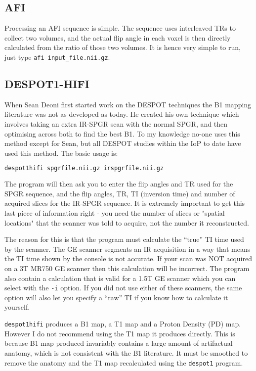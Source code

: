 \documentclass{report}
\begin{document}
\subsection{AFI}

Processing an AFI sequence is simple. The sequence uses interleaved TRs to collect two volumes, and the actual flip angle in each voxel is then directly calculated from the ratio of those two volumes. It is hence very simple to run, just type \texttt{afi input\_file.nii.gz}.

\subsection{DESPOT1-HIFI}

When Sean Deoni first started work on the DESPOT techniques the B1 mapping literature was not as developed as today. He created his own technique which involves taking an extra IR-SPGR scan with the normal SPGR, and then optimising across both to find the best B1. To my knowledge no-one uses this method except for Sean, but all DESPOT studies within the IoP to date have used this method. The basic usage is:

\begin{lstlisting}[language=sh]
despot1hifi spgrfile.nii.gz irspgrfile.nii.gz
\end{lstlisting}

The program will then ask you to enter the flip angles and TR used for the SPGR sequence, and the flip angles, TR, TI (inversion time) and number of acquired slices for the IR-SPGR sequence. It is extremely important to get this last piece of information right - you need the number of slices or "spatial locations" that the scanner was told to acquire, not the number it reconstructed.

The reason for this is that the program must calculate the ``true'' TI time used by the scanner. The GE scanner segments an IR acquisition in a way that means the TI time shown by the console is not accurate. If your scan was NOT acquired on a 3T MR750 GE scanner then this calculation will be incorrect. The program also contain a calculation that is valid for a 1.5T GE scanner which you can select with the \texttt{-i} option. If you did not use either of these scanners, the same option will also let you specify a ``raw'' TI if you know how to calculate it yourself.

\texttt{despot1hifi} produces a B1 map, a T1 map and a Proton Density (PD) map. However I do not recommend using the T1 map it produces directly. This is because B1 map produced invariably contains a large amount of artifactual anatomy, which is not consistent with the B1 literature. It must be smoothed to remove the anatomy and the T1 map recalculated using the \texttt{despot1} program.
\end{document}
